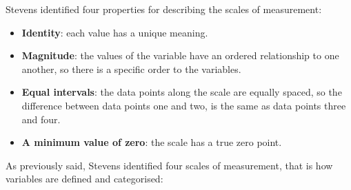 \documentclass[
  letterpaper,
  DIV=11,
  numbers=noendperiod]{scrartcl}
\providecommand{\tightlist}{%
  \setlength{\itemsep}{0pt}\setlength{\parskip}{0pt}}\usepackage{longtable,booktabs,array}
\begin{document}
Stevens identified four properties for describing the scales of
measurement:

\begin{itemize}
\tightlist
\item
  \textbf{Identity}: each value has a unique meaning.
\item
  \textbf{Magnitude}: the values of the variable have an ordered
  relationship to one another, so there is a specific order to the
  variables.
\item
  \textbf{Equal intervals}: the data points along the scale are equally
  spaced, so the difference between data points one and two, is the same
  as data points three and four.
\item
  \textbf{A minimum value of zero}: the scale has a true zero point.
\end{itemize}

As previously said, Stevens identified four scales of measurement, that
is how variables are defined and categorised:
\end{document}
